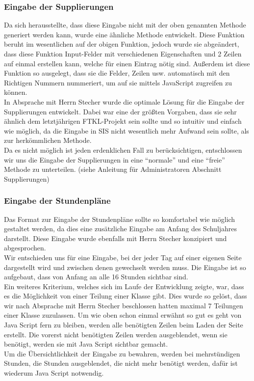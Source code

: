 \subsubsection{Eingabe der Supplierungen}
Da sich herausstellte, dass diese Eingabe nicht mit der oben genannten Methode generiert werden kann, wurde eine ähnliche Methode entwickelt. Diese Funktion beruht im wesentlichen auf der obigen Funktion, jedoch wurde sie abgeändert, dass diese Funktion Input-Felder mit verschiedenen Eigenschaften und 2 Zeilen auf einmal erstellen kann, welche für einen Eintrag nötig sind. Außerdem ist diese Funktion so ausgelegt, dass sie die Felder, Zeilen usw. automatisch mit den Richtigen Nummern nummeriert, um auf sie mittels JavaScript zugreifen zu können.\\
In Absprache mit Herrn Stecher wurde die optimale Lösung für die Eingabe der Supplierungen entwickelt. Dabei war eine der größten Vorgaben, dass sie sehr ähnlich dem letztjährigen FTKL-Projekt sein sollte und so intuitiv und einfach wie möglich, da die Eingabe in SIS nicht wesentlich mehr Aufwand sein sollte, als zur herkömmlichen Methode.\\
Da es nicht möglich ist jeden erdenklichen Fall zu berücksichtigen, entschlossen wir uns die Eingabe der Supplierungen in eine \enquote{normale} und eine \enquote{freie} Methode zu unterteilen. (siehe Anleitung für Administratoren Abschnitt Supplierungen)
\subsubsection{Eingabe der Stundenpläne}
Das Format zur Eingabe der Stundenpläne sollte so komfortabel wie möglich gestaltet werden, da dies eine zusätzliche Eingabe am Anfang des Schuljahres darstellt. Diese Eingabe wurde ebenfalls mit Herrn Stecher konzipiert und abgesprochen.\\
Wir entschieden uns für eine Eingabe, bei der jeder Tag auf einer eigenen Seite dargestellt wird und zwischen denen gewechselt werden muss. Die Eingabe ist so aufgebaut, dass von Anfang an alle 16 Stunden sichtbar sind.\\ 
Ein weiteres Kriterium, welches sich im Laufe der Entwicklung zeigte, war, dass es die Möglichkeit von einer Teilung einer Klasse gibt. Dies wurde so gelöst, dass wir nach Absprache mit Herrn Stecher beschlossen hatten maximal 7 Teilungen einer Klasse zuzulassen. Um wie oben schon einmal erwähnt so gut es geht von Java Script fern zu bleiben, werden alle benötigten Zeilen beim Laden der Seite erstellt. Die vorerst nicht benötigten Zeilen werden ausgeblendet, wenn sie benötigt, werden sie mit Java Script sichtbar gemacht.\\
Um die Übersichtlichkeit der Eingabe zu bewahren, werden bei mehrstündigen Stunden, die Stunden ausgeblendet, die nicht mehr benötigt werden, dafür ist wiederum Java Script notwendig.
